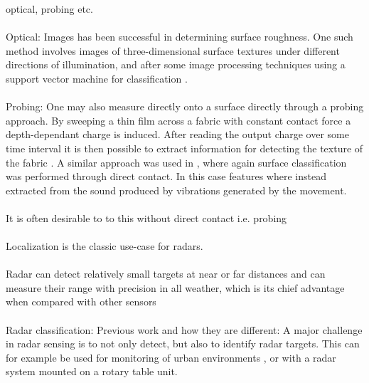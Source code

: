 optical, probing etc.
\\ \\
\noindent Optical: Images has been successful in determining surface roughness. One such method involves images of three-dimensional surface textures under different directions of illumination, and after some image processing techniques using a support vector machine for classification \citep{dong_duan_yang_2008}. 
\\ \\
\noindent Probing: One may also measure directly onto a surface directly through a probing approach. By sweeping a thin film across a fabric with constant contact force a depth-dependant charge is induced. After reading the output charge over some time interval it is then possible to extract information for detecting the texture of the fabric \citep{song_han_hu_li_2014}. A similar approach was used in \citep{strese_schuwerk_iepure_steinbach_2017}, where again surface classification was performed through direct contact. In this case features where instead extracted from the sound produced by vibrations generated by the movement. 
\\ \\
It is often desirable to to this without direct contact i.e. probing
\\ \\
Localization is the classic use-case for radars. 
\\ \\
 Radar  can detect relatively small targets at near or far distances and can measure their range with  precision  in  all weather,  which is  its chief  advantage when compared with other  sensors \citep{skolnik}
\\ \\
Radar classification: Previous work and how they are different: A major challenge in radar sensing is to not only detect, but also to identify radar targets. This can for example be used for monitoring of urban environments \citep{harter_kowalewski_sit_jalilvand_ziroff_zwick_2014}, or with a radar system mounted on a rotary table unit. 

